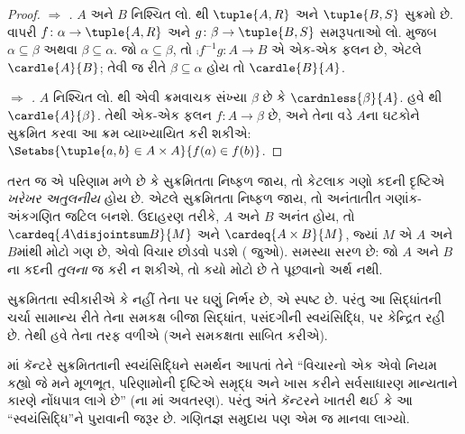 \begin{proof}
\emph{ $\Rightarrow$ .}
$A$ અને $B$ નિશ્ચિત લો. થી
$\tuple{A, R}$ અને $\tuple{B, S}$ સુક્રમો છે.
વાપરી $f \colon \alpha \to \tuple{A, R}$
અને $g \colon \beta \to \tuple{B, S}$
સમરૂપતાઓ લો.
મુજબ $\alpha \subseteq \beta$ અથવા
$\beta \subseteq \alpha$. જો
$\alpha \subseteq \beta$, તો
$\comp{f^{-1}}{g} \colon A \to B$
એ એક-એક ફલન છે, એટલે
$\cardle{A}{B}$; તેવી જ રીતે
$\beta \subseteq \alpha$ હોય તો
$\cardle{B}{A}$.

\emph{ $\Rightarrow$ .}
$A$ નિશ્ચિત લો. થી
એવી ક્રમવાચક સંખ્યા $\beta$ છે કે
$\cardnless{\beta}{A}$. હવે
થી
$\cardle{A}{\beta}$. તેથી એક-એક ફલન
$f \colon A \to \beta$ છે, અને તેના વડે
$A$ના ઘટકોને સુક્રમિત કરવા આ ક્રમ
વ્યાખ્યાયિત કરી શકીએ:
$\Setabs{\tuple{a, b} \in A \times A}{f(a)
\in f(b)}$.
\end{proof}
\noindent
તરત જ એ પરિણામ મળે છે કે સુક્રમિતતા
નિષ્ફળ જાય, તો કેટલાક ગણો કદની દૃષ્ટિએ
\emph{ખરેખર અતુલનીય} હોય છે. એટલે
સુક્રમિતતા નિષ્ફળ જાય, તો અનંતાતીત
ગણાંક-અંકગણિત જટિલ બનશે. ઉદાહરણ તરીકે,
$A$ અને $B$ અનંત હોય, તો
$\cardeq{A \disjointsum B}{M}$ અને
$\cardeq{A \times B}{M}$, જ્યાં
$M$ એ $A$ અને $B$માંથી મોટો ગણ છે,
એવો વિચાર છોડવો પડશે
( જુઓ).
સમસ્યા સરળ છે: જો $A$ અને $B$ના કદની
\emph{તુલના} જ કરી ન શકીએ, તો કયો મોટો
છે તે પૂછવાનો અર્થ નથી.
\endgroup

\begingroup
\makeatletter{}\makeatother

\label{guunit:OLP-0596}


સુક્રમિતતા સ્વીકારીએ કે નહીં તેના પર ઘણું
નિર્ભર છે, એ સ્પષ્ટ છે. પરંતુ આ સિદ્ધાંતની
ચર્ચા સામાન્ય રીતે તેના સમકક્ષ બીજા સિદ્ધાંત,
પસંદગીની સ્વયંસિદ્ધિ, પર કેન્દ્રિત રહી છે.
તેથી હવે તેના તરફ વળીએ (અને સમકક્ષતા
સાબિત કરીએ).

\citeyear{Cantor1883}માં કૅન્ટરે સુક્રમિતતાની
સ્વયંસિદ્ધિને સમર્થન આપતાં તેને ``વિચારનો
એક એવો નિયમ કહ્યો જે મને મૂળભૂત,
પરિણામોની દૃષ્ટિએ સમૃદ્ધ અને ખાસ કરીને
સર્વસાધારણ માન્યતાને કારણે નોંધપાત્ર લાગે છે''
(\citeauthor{Potter2004}ના
\citeyear[p.~243]{Potter2004}માં અવતરણ).
પરંતુ અંતે કૅન્ટરને ખાતરી થઈ કે આ
``સ્વયંસિદ્ધિ''ને પુરાવાની જરૂર છે.
ગણિતજ્ઞ સમુદાય પણ એમ જ માનવા લાગ્યો.

